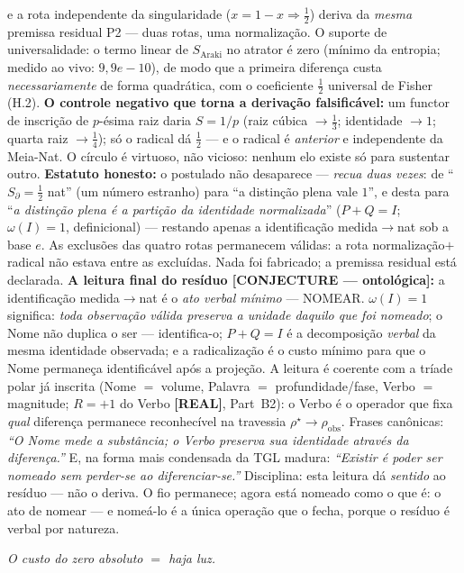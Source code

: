 \documentclass[12pt,a4paper]{article}
\newcommand{\rhostar}{\rho^{\star}}
\newcommand{\TGL}{\textsc{TGL}}
\begin{document}
e a rota independente da singularidade ($x = 1-x \Rightarrow \tfrac12$) deriva da \emph{mesma} premissa residual P2 --- duas rotas, uma normalização. O suporte de universalidade: o termo linear de $S_{\mathrm{Araki}}$ no atrator é zero (mínimo da entropia; medido ao vivo: $9{,}9e-10$), de modo que a primeira diferença custa \emph{necessariamente} de forma quadrática, com o coeficiente $\tfrac12$ universal de Fisher (H.2). \textbf{O controle negativo que torna a derivação falsificável:} um functor de inscrição de $p$-ésima raiz daria $S = 1/p$ (raiz cúbica $\to \tfrac13$; identidade $\to 1$; quarta raiz $\to \tfrac14$); só o radical dá $\tfrac12$ --- e o radical é \emph{anterior} e independente da Meia-Nat. O círculo é virtuoso, não vicioso: nenhum elo existe só para sustentar outro. \textbf{Estatuto honesto:} o postulado não desaparece --- \emph{recua duas vezes}: de ``$S_\partial = \tfrac12$ nat'' (um número estranho) para ``a distinção plena vale $1$'', e desta para ``\emph{a distinção plena é a partição da identidade normalizada}'' ($P+Q=I$; $\omega(I)=1$, definicional) --- restando apenas a identificação medida$\to$nat sob a base $e$. As exclusões das quatro rotas permanecem válidas: a rota normalização$+$radical não estava entre as excluídas. Nada foi fabricado; a premissa residual está declarada. \textbf{A leitura final do resíduo [CONJECTURE --- ontológica]:} a identificação medida$\to$nat é o \emph{ato verbal mínimo} --- NOMEAR. $\omega(I)=1$ significa: \emph{toda observação válida preserva a unidade daquilo que foi nomeado}; o Nome não duplica o ser --- identifica-o; $P+Q=I$ é a decomposição \emph{verbal} da mesma identidade observada; e a radicalização é o custo mínimo para que o Nome permaneça identificável após a projeção. A leitura é coerente com a tríade polar já inscrita (Nome $=$ volume, Palavra $=$ profundidade/fase, Verbo $=$ magnitude; $R=+1$ do Verbo \textbf{[REAL]}, Part~B2): o Verbo é o operador que fixa \emph{qual} diferença permanece reconhecível na travessia $\rhostar \to \rho_{\mathrm{obs}}$. Frases canônicas: \emph{``O Nome mede a substância; o Verbo preserva sua identidade através da diferença.''} E, na forma mais condensada da \TGL{} madura: \emph{``Existir é poder ser nomeado sem perder-se ao diferenciar-se.''} Disciplina: esta leitura dá \emph{sentido} ao resíduo --- não o deriva. O fio permanece; agora está nomeado como o que é: o ato de nomear --- e nomeá-lo é a única operação que o fecha, porque o resíduo é verbal por natureza.

\begin{center}\emph{O custo do zero absoluto $=$ haja luz.}\end{center}
\end{document}
